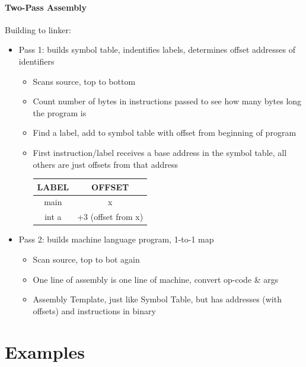 \documentclass[12 pt]{article}
\begin{document}
\paragraph{Two-Pass Assembly}
Building to linker:
\begin{itemize}
\item Pass 1: builds symbol table, indentifies labels, determines offset addresses of identifiers
\begin{itemize}
\item Scans source, top to bottom
\item Count number of bytes in instructions passed to see how many bytes long the program is
\item Find a label, add to symbol table with offset from beginning of program
\item First instruction/label receives a base address in the symbol table, all others are just offsets from that address
\\
\begin{tabular}{|c|c|}
LABEL&OFFSET
\\ \hline main & x
\\ int a & +3 (offset from x)
\end{tabular}

\end{itemize}
\item Pass 2: builds machine language program, 1-to-1 map
\begin{itemize}
\item Scan source, top to bot again
\item One line of assembly is one line of machine, convert op-code \& args
\item Assembly Template, just like Symbol Table, but has addresses (with offsets) and instructions in binary
\end{itemize}
\end{itemize}
	\section{Examples}
\end{document}
